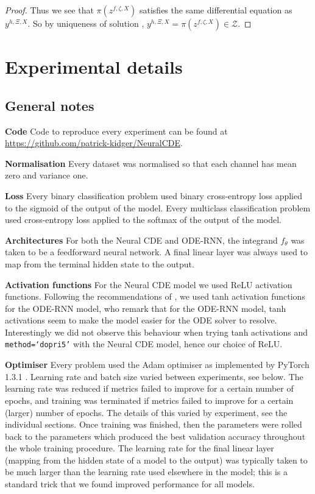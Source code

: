 \documentclass{article}
\theoremstyle{plain}
\theoremstyle{definition}
\newcommand{\boldheading}[1]{

\textbf{#1}\quad}
\begin{document}
\begin{proof}
	Thus we see that $\pi(z^{f, \zeta, X})$ satisfies the same differential equation as $y^{h, \Xi, X}$. So by uniqueness of solution \cite[Theorem 1.3]{levy-lyons}, $y^{h, \Xi, X} = \pi(z^{f, \zeta, X}) \in \mathcal{Z}$.
	\end{proof}
	
	\section{Experimental details}\label{appendix:experimental-details}
	
	\subsection{General notes}
	\boldheading{Code}
	Code to reproduce every experiment can be found at \url{https://github.com/patrick-kidger/NeuralCDE}.
	
	\boldheading{Normalisation}
	Every dataset was normalised so that each channel has mean zero and variance one.
	
	\boldheading{Loss}
	Every binary classification problem used binary cross-entropy loss applied to the sigmoid of the output of the model. Every multiclass classification problem used cross-entropy loss applied to the softmax of the output of the model.

	\boldheading{Architectures}
	For both the Neural CDE and ODE-RNN, the integrand $f_\theta$ was taken to be a feedforward neural network. A final linear layer was always used to map from the terminal hidden state to the output.
	
	\boldheading{Activation functions}
	For the Neural CDE model we used ReLU activation functions. Following the recommendations of \cite{latent-odes}, we used tanh activation functions for the ODE-RNN model, who remark that for the ODE-RNN model, tanh activations seem to make the model easier for the ODE solver to resolve. Interestingly we did not observe this behaviour when trying tanh activations and \texttt{method=`dopri5'} with the Neural CDE model, hence our choice of ReLU.
	
	\boldheading{Optimiser}
	Every problem used the Adam \cite{kingma2015} optimiser as implemented by PyTorch 1.3.1 \cite{pytorch}. Learning rate and batch size varied between experiments, see below. The learning rate was reduced if metrics failed to improve for a certain number of epochs, and training was terminated if metrics failed to improve for a certain (larger) number of epochs. The details of this varied by experiment, see the individual sections. Once training was finished, then the parameters were rolled back to the parameters which produced the best validation accuracy throughout the whole training procedure. The learning rate for the final linear layer (mapping from the hidden state of a model to the output) was typically taken to be much larger than the learning rate used elsewhere in the model; this is a standard trick that we found improved performance for all models.
	
\end{document}
